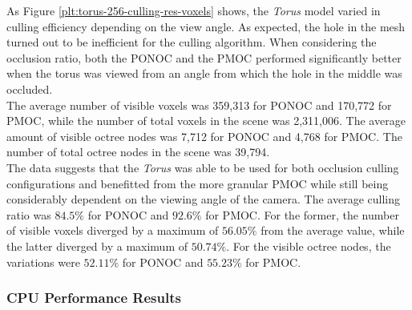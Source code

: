 
\noindent
As Figure \ref{plt:torus-256-culling-res-voxels} shows, the \emph{Torus} model varied in culling efficiency 
depending on the view angle. As expected, the hole in the mesh turned out to be inefficient for the culling 
algorithm. When considering the occlusion ratio, both the \ac{PONOC} and the \ac{PMOC} performed significantly 
better when the torus was viewed from an angle from which the hole in the middle was occluded. \\

\noindent
The average number of visible voxels was 359,313 for \ac{PONOC} and 170,772 for \ac{PMOC}, while the number 
of total voxels in the scene was 2,311,006. The average amount of visible octree nodes was 7,712 for \ac{PONOC} 
and 4,768 for \ac{PMOC}. The number of total octree nodes in the scene was 39,794. \\

\noindent
The data suggests that the \emph{Torus} was able to be used for both occlusion culling configurations and benefitted 
from the more granular \ac{PMOC} while still being considerably dependent on the viewing angle of the camera. The 
average culling ratio was $84.5\%$ for \ac{PONOC} and $92.6\%$ for \ac{PMOC}. For the former, the number of visible 
voxels diverged by a maximum of $56.05\%$ from the average value, while the latter diverged by a maximum of $50.74\%$. 
For the visible octree nodes, the variations were $52.11\%$ for \ac{PONOC} and $55.23\%$ for \ac{PMOC}.

\subsubsection*{CPU Performance Results} \label{subsubsec-cpu-performance-results-torus}

